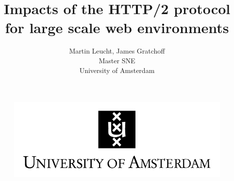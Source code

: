 \documentclass{article}
\begin{document}
 
\begin{figure}[!bh]
 	\begin{center}
 	 
 		\huge \title{Impacts of the HTTP/2 protocol for large scale web environments}
		\author{Martin Leucht, James Gratchoff \\
		Master SNE \\ University of Amsterdam} 
		\includegraphics{images/uva.jpeg}
	\maketitle 
		\label{sec:uva}
	\end{center}
\end{figure}
\setlength{\columnsep}{2cm}
\def\columnseprulecolor{\color{blue}}
 
\newpage
\tableofcontents
\end{document}
